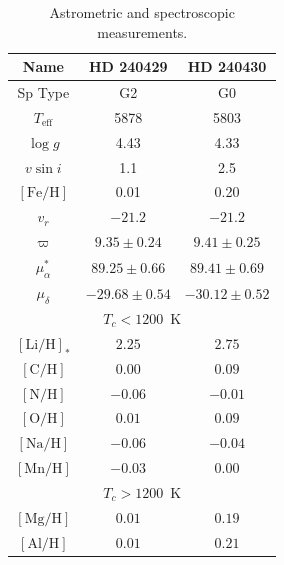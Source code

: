 \documentclass[manuscript]{aastex6}
\newcommand*\elem[1]{\ensuremath{\mathrm{#1}}}
\newcommand*\elemH[1]{\ensuremath{[\mathrm{#1}/\elem{H}]}}
\begin{document}
\begin{table}[htpb]
  \caption{Astrometric and spectroscopic measurements.}
  \label{tab:t2}
  \begin{threeparttable}
  \centering
  \begin{tabular}{ccc}
\hline\hline
Name & HD 240429 & HD 240430 \\
\hline
Sp Type                                   & G2                & G0                \\
$T_\mathrm{eff}$                          & 5878              & 5803              \\
$\log{g}$                                 & 4.43              & 4.33              \\
$v\sin{i}$                                & 1.1               & 2.5               \\
$[\elem{Fe}/\elem{H}]$                    & 0.01              & 0.20              \\
$v_r$                                     & $-21.2$           & $-21.2$           \\
$\varpi$ \footnotemark[1]                 & $9.35 \pm 0.24$   & $9.41 \pm 0.25$   \\
$\mu_\alpha^*$ \footnotemark[1]           & $89.25 \pm 0.66$  & $89.41 \pm 0.69$  \\
$\mu_\delta$ \footnotemark[1]             & $-29.68 \pm 0.54$ & $-30.12 \pm 0.52$ \\
\hline
\multicolumn{3}{c}{$T_c < 1200$~K} \\
\hline
$\elemH{Li}_*$ \footnotemark[2]           & $2.25$            & $2.75$            \\
$\elemH{C}$                               & $0.00$            & $0.09$            \\
$\elemH{N}$                               & $-0.06$           & $-0.01$           \\
$\elemH{O}$                               & $0.01$            & $0.09$            \\
$\elemH{Na}$                              & $-0.06$           & $-0.04$           \\
$\elemH{Mn}$                              & $-0.03$           & $0.00$            \\
\hline
\multicolumn{3}{c}{$T_c > 1200$~K} \\
\hline
$\elemH{Mg}$                              & $0.01$            & $0.19$            \\
$\elemH{Al}$                              & $0.01$            & $0.21$            \\

\end{tabular}
\end{threeparttable}
\end{table}
\end{document}
